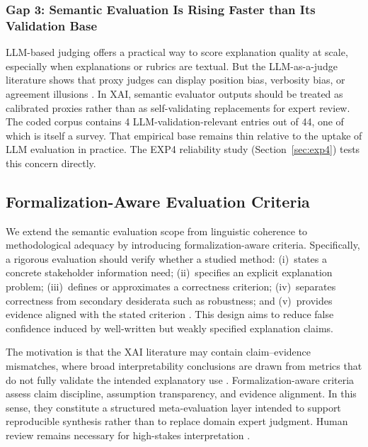 \documentclass[fleqn,10pt,lineno]{wlpeerj}
\begin{document}
\subsubsection{Gap 3: Semantic Evaluation Is Rising Faster than Its Validation Base}

LLM-based judging offers a practical way to score explanation quality at
scale, especially when explanations or rubrics are textual. But the
LLM-as-a-judge literature shows that proxy judges can display position
bias, verbosity bias, or agreement illusions
\citep{zheng2023judging,gu2024llmjudge}. In XAI, semantic evaluator
outputs should be treated as calibrated proxies rather than as
self-validating replacements for expert review. The coded corpus contains
4 LLM-validation-relevant entries out of 44, one of which is itself a survey.
That empirical base remains thin relative to the uptake of LLM evaluation
in practice.
The EXP4 reliability study (Section~\ref{sec:exp4}) tests this concern
directly.


\subsection{Formalization-Aware Evaluation Criteria}
\label{sec:formalization_aware}

We extend the semantic evaluation scope from linguistic coherence to
methodological adequacy by introducing formalization-aware criteria.
Specifically, a rigorous evaluation should verify whether a studied method:
(i)~states a concrete stakeholder information need; (ii)~specifies an
explicit explanation problem; (iii)~defines or approximates a correctness
criterion; (iv)~separates correctness from secondary desiderata such as
robustness; and (v)~provides evidence aligned with the stated criterion
\citep{haufe2026formalization,sokol2020factsheets}. This design aims to
reduce false confidence induced by well-written but weakly specified
explanation claims.

The motivation is that the XAI literature may contain claim--evidence
mismatches, where broad interpretability conclusions are drawn from metrics
that do not fully validate the intended explanatory use
\citep{haufe2026formalization,hedstrom2023quantus}. Formalization-aware
criteria assess claim discipline, assumption transparency, and evidence
alignment. In this sense, they constitute a structured meta-evaluation
layer intended to support reproducible synthesis rather than to replace
domain expert judgment. Human review remains necessary for high-stakes
interpretation \citep{bucinca2020proxy,bansal2021whole,fok2023verifiability}.
\end{document}
